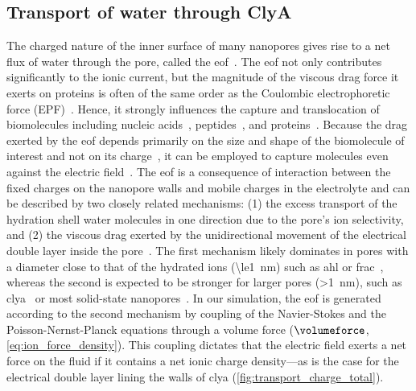\subsection{Transport of water through {ClyA}}
%
\label{sec:eof}
%

The charged nature of the inner surface of many nanopores gives rise to a net flux of water through the pore,
called the \gls{eof}~\cite{Qiao-Aluru-2003,Thompson-2003,Mao-2014}. The \gls{eof} not only contributes
significantly to the ionic current, but the magnitude of the viscous drag force it exerts on proteins is often
of the same order as the Coulombic electrophoretic force
(EPF)~\cite{vanDorp-2009,Firnkes-2010,Willems-Ruic-Biesemans-2019}. Hence, it strongly influences the capture
and translocation of biomolecules including nucleic acids~\cite{Wong-2007,Luan-2008,Firnkes-2010},
peptides~\cite{Huang-2017,Li-2018,Huang-2019}, and proteins~\cite{Soskine-2012,Soskine-2013,VanMeervelt-2014,
Soskine-Biesemans-2015,Biesemans-2015,Wloka-2017,Galenkamp-2018,Willems-Ruic-Biesemans-2019}. Because the drag
exerted by the \gls{eof} depends primarily on the size and shape of the biomolecule of interest and not on its
charge~\cite{Willems-Ruic-Biesemans-2019}, it can be employed to capture molecules even against the electric
field~\cite{Soskine-2012}. The \gls{eof} is a consequence of interaction between the fixed charges on the
nanopore walls and mobile charges in the electrolyte and can be described by two closely related mechanisms:
(1) the excess transport of the hydration shell water molecules in one direction due to the pore's ion
selectivity, and (2) the viscous drag exerted by the unidirectional movement of the electrical double layer
inside the pore~\cite{Tagliazucchi-2015,Bonome-2017}. The first mechanism likely dominates in pores with a
diameter close to that of the hydrated ions (\SI{\le1}{\nm}) such as \gls{ahl} or
\gls{frac}~\cite{Huang-2017,Huang-2019}, whereas the second is expected to be stronger for larger pores
(\SI{>1}{\nm}), such as \gls{clya}~\cite{Soskine-2012,Willems-Ruic-Biesemans-2019} or most solid-state
nanopores~\cite{Mao-2014,Laohakunakorn-2015}. In our simulation, the \gls{eof} is generated according to the
second mechanism by coupling of the Navier-Stokes and the Poisson-Nernst-Planck equations through a volume
force ($\volumeforce$, \cref{eq:ion_force_density}). This coupling dictates that the electric field exerts a
net force on the fluid if it contains a net ionic charge density---as is the case for the electrical double
layer lining the walls of \gls{clya} (\cref{fig:transport_charge_total}).

